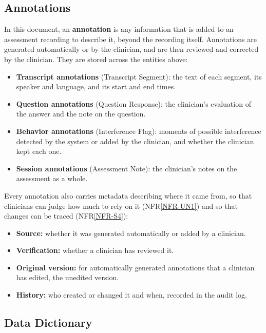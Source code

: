 \documentclass[12pt]{article}
\newcommand{\nfrref}[1]{NFR\ref{#1}}
\begin{document}
\subsection{Annotations} \label{sec:Annotations}

In this document, an \textbf{annotation} is any information that is added to an assessment recording to describe it, beyond the recording itself. Annotations are generated automatically or by the clinician, and are then reviewed and corrected by the clinician. They are stored across the entities above:

\begin{itemize}
\item \textbf{Transcript annotations} (Transcript Segment): the text of each segment, its speaker and language, and its start and end times.
\item \textbf{Question annotations} (Question Response): the clinician’s evaluation of the answer and the note on the question.
\item \textbf{Behavior annotations} (Interference Flag): moments of possible interference detected by the system or added by the clinician, and whether the clinician kept each one.
\item \textbf{Session annotations} (Assessment Note): the clinician’s notes on the assessment as a whole.
\end{itemize}

Every annotation also carries metadata describing where it came from, so that clinicians can judge how much to rely on it (\nfrref{NFR-UN1}) and so that changes can be traced (\nfrref{NFR-S4}):

\begin{itemize}
\item \textbf{Source:} whether it was generated automatically or added by a clinician.
\item \textbf{Verification:} whether a clinician has reviewed it.
\item \textbf{Original version:} for automatically generated annotations that a clinician has edited, the unedited version.
\item \textbf{History:} who created or changed it and when, recorded in the audit log.
\end{itemize}

\subsection{Data Dictionary}
\end{document}
